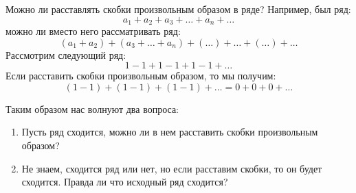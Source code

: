\documentclass[12pt]{article}
\theoremstyle{definition}
\begin{document}
Можно ли расставлять скобки произвольным образом в ряде? Например, был ряд: 
$$
	a_1 + a_2 + a_3 + \dotsc + a_n + \dotsc
$$
можно ли вместо него рассматривать ряд:
$$
	(a_1 + a_2) + (a_3 + \dotsc + a_n) + (\dotsc) + \dotsc + (\dotsc) + \dotsc
$$
Рассмотрим следующий  ряд:
$$
	1 - 1 + 1 - 1 + 1 - 1 + \dotsc
$$
Если расставить скобки произвольным образом, то мы получим:
$$
	(1 - 1) + (1 - 1) + (1 - 1) + \dotsc = 0 + 0 + 0 + \dotsc
$$

Таким образом нас волнуют два вопроса:
\begin{enumerate}[label ={(\arabic*)}]
	\item Пусть ряд сходится, можно ли в нем расставить скобки произвольным образом?
	\item Не знаем, сходится ряд или нет, но если расставим скобки, то он будет сходится. Правда ли что исходный ряд сходится?
\end{enumerate}
\end{document}

